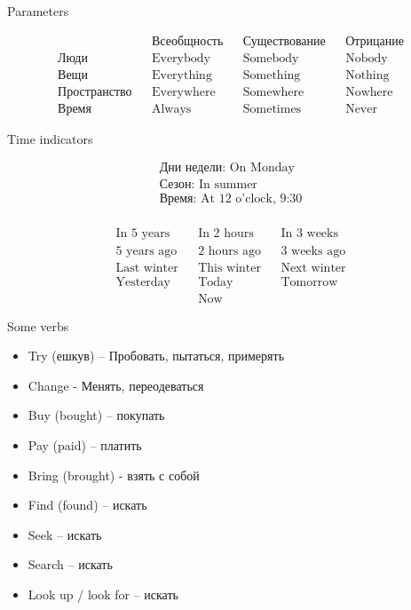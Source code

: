 \documentclass{tstextbook}
\begin{document}
\begin{theorem} Parameters
	\label{th: Parameters}
	
	\begin{align*}
		&& \text{Всеобщность} && \text{Существование} && \text{Отрицание} \\
		\text{Люди} && \text{Everybody} && \text{Somebody} && \text{Nobody} \\
		\text{Вещи} && \text{Everything} && \text{Something} && \text{Nothing} \\
		\text{Пространство} && \text{Everywhere} && \text{Somewhere} && \text{Nowhere} \\
		\text{Время} && \text{Always} && \text{Sometimes} && \text{Never}
	\end{align*}
\end{theorem}

\begin{theorem} Time indicators
	\label{th: Time_indicators}
	
	\begin{align*}
		\text{Дни недели: On Monday} \\
		\text{Сезон: In summer} \\
		\text{Время: At 12 o'clock, 9:30} \\
	\end{align*}
	
	\begin{align*}
		\text{In 5 years} && \text{In 2 hours} && \text{In 3 weeks} \\
		\text{5 years ago} && \text{2 hours ago} && \text{3 weeks ago} \\		
		\text{Last winter} && \text{This winter} && \text{Next winter} \\
		\text{Yesterday} && \text{Today} && \text{Tomorrow} \\
		&& \text{Now} &&
	\end{align*}
\end{theorem}
	
	\begin{example}Some verbs
		\label{def:some_verbs}
		\begin{itemize}
			\item Try (ешкув) -- Пробовать, пытаться, примерять
			\item Change - Менять, переодеваться
			\item Buy (bought) -- покупать
			\item Pay (paid) -- платить
			\item Bring (brought) - взять с собой
			\item Find (found) -- искать
			\item Seek -- искать
			\item Search -- искать
			\item Look up / look for -- искать
		\end{itemize}
	\end{example}
	
\end{document}
